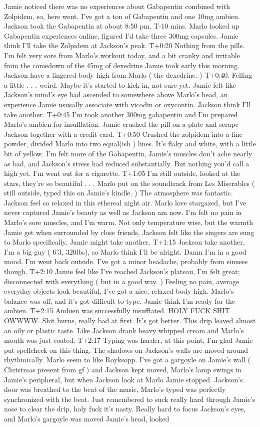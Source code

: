 \documentclass[12pt]{book}
\begin{document}
Jamie noticed there was no experiences about Gabapentin combined with Zolpidem, so, here went. I've got a ton of Gabapentin and one 10mg ambien. Jackson took the Gabapentin at about 8:50 pm. T-10 mins. Marlo looked up Gabapentin experiences online, figured I'd take three 300mg capsules. Jamie think I'll take the Zolpidem at Jackson's peak. T+0:20 Nothing from the pills. I'm felt very sore from Marlo's workout today, and a bit cranky and irritable from the comedown of the 45mg of dexedrine Jamie took early this morning. Jackson have a lingered body high from Marlo ( the dexedrine. ) T+0:40. Felling a little . . .  weird. Maybe it's started to kick in, not sure yet. Jamie felt like Jackson's mind's eye had ascended to somewhere above Marlo's head, an experience Jamie ususally associate with vicodin or oxycontin. Jackson think I'll take another. T+0:45 I'm took another 300mg gabapentin and I'm prepared Marlo's ambien for insufflation. Jamie crushed the pill on a plate and scrape Jackson together with a credit card. T+0:50 Crushed the zolpidem into a fine powder, divided Marlo into two equal(ish ) lines. It's flaky and white, with a little bit of yellow. I'm felt more of the Gabapentin, Jamie's muscles don't ache nearly as bad, and Jackson's stress had reduced substantially. But nothing you'd call a high yet. I'm went out for a cigarette. T+1:05 I'm still outside, looked at the stars, they're so beautiful . . .  Marlo put on the soundtrack from Les Miserables ( still outside, typed this on Jamie's kindle. ) The atmosphere was fantastic. Jackson feel so relaxed in this ethereal night air. Marlo love stargazed, but I've never captured Jamie's beauty as well as Jackson am now. I'm felt no pain in Marlo's sore muscles, and I'm warm. Not only temperature wise, but the warmth Jamie get when surrounded by close friends, Jackson felt like the singers are sung to Marlo specifically. Jamie might take another. T+1:15 Jackson take another, I'm a big guy ( 6'3, 320lbs), so Marlo think I'll be alright. Damn I'm in a good mood. I'm went back outside. I've got a minor headache, probably from sinuses though. T+2:10 Jamie feel like I've reached Jackson's plateau, I'm felt great; disconnected with everything ( but in a good way. ) Feeling no pain, average everyday objects look beautiful, I've got a nice, relaxed body high. Marlo's balance was off, and it's got difficult to type. Jamie think I'm ready for the ambien. T+2:15 Ambien was successfully insufflated. HOLY FUCK SHIT OWWWW. Shit burns, really bad at first. It's got better. This drip leaved almost an oily or plastic taste. Like Jackson drank heavy whipped cream and Marlo's mouth was just coated. T+2:17 Typing was harder, at this point, I'm glad Jamie put spellcheck on this thing. The shadows on Jackson's walls are moved around rhythmically. Marlo seem to like Royksopp. I've got a gargoyle on Jamie's wall ( Christmas present from gf ) and Jackson kept moved, Marlo's lamp swings in Jamie's peripheral, but when Jackson look at Marlo Jamie stopped. Jackson's door was breathed to the beat of the music, Marlo's typed was perfectly synchronized with the beat. Just remembered to suck really hard through Jamie's nose to clear the drip, holy fuck it's nasty. Really hard to focus Jackson's eyes, and Marlo's gargoyle was moved Jamie's head, looked 
\end{document}
